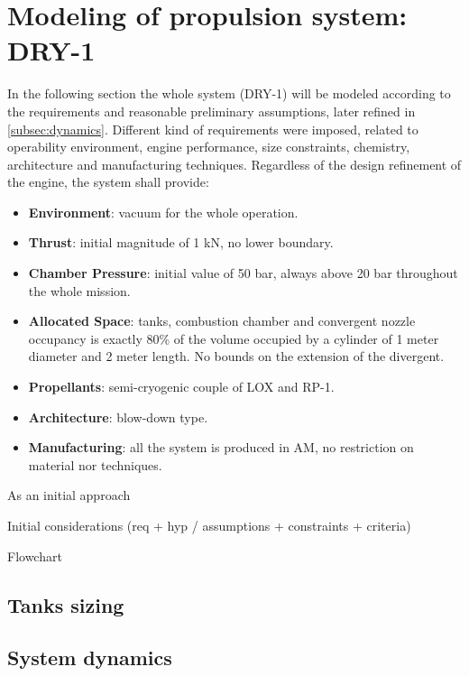 \section{Modeling of propulsion system: DRY-1}
\label{sec:modeling}
In the following section the whole system (DRY-1) will be modeled according to the requirements and reasonable preliminary assumptions, later refined in \autoref{subsec:dynamics}. 
Different kind of requirements were imposed, related to operability environment, engine performance, size constraints, chemistry, architecture and manufacturing techniques. Regardless of the design refinement of the engine, the system shall provide:
\begin{itemize}
    \item \textbf{Environment}: vacuum for the whole operation.
    \item \textbf{Thrust}: initial magnitude of 1 kN, no lower boundary.
    \item \textbf{Chamber Pressure}: initial value of 50 bar, always above 20 bar throughout the whole mission.
    \item \textbf{Allocated Space}: tanks, combustion chamber and convergent nozzle occupancy is exactly 80\% of the volume occupied by a cylinder of 1 meter diameter and 2 meter length. No bounds on the extension of the divergent.
    \item \textbf{Propellants}: semi-cryogenic couple of LOX and RP-1.
    \item \textbf{Architecture}: blow-down type.
    \item \textbf{Manufacturing}: all the system is produced in AM, no restriction on material nor techniques. 
\end{itemize} 

As an initial approach 

Initial considerations (req + hyp / assumptions + constraints + criteria)

Flowchart

\subsection{Tanks sizing}
\label{subsec:tanks}

\subsection{System dynamics}
\label{subsec:dynamics}

